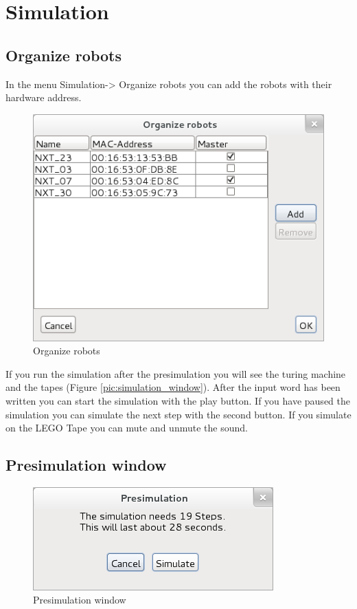\documentclass[%
  a4paper,%
  11pt,%
  blue,%
  hyperref	%
  ]{tubsartcl}
\begin{document}
\newpage

\section{Simulation}



\subsection{Organize robots}
In the menu Simulation-> Organize robots you can add the robots with their hardware address.
\begin{figure}[!htb]
\begin{center}
\includegraphics[scale=0.45]{graphics_gui/organize_robots.png}
\end{center}
\caption{Organize robots}
\label{pic:organize_robots}
\end{figure}

\newpage
If you run the simulation after the presimulation you will see the turing machine and the tapes (Figure \ref{pic:simulation_window}). After the input word has been written you can start the simulation with the play button. If you have paused the simulation you can simulate the next step with the second button. If you simulate on the LEGO Tape you can mute and unmute the sound.
\subsection{Presimulation window}

\begin{figure}[!htb]
\begin{center}
\includegraphics[scale=0.4]{graphics_gui/presimulation.png}
\end{center}
\caption{Presimulation window}
\label{pic:presimulation}
\end{figure}
\end{document}
